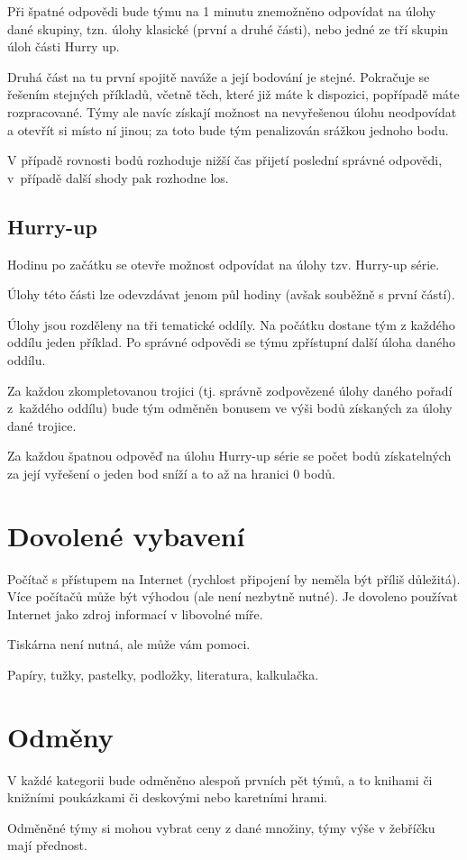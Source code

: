 \documentclass[a4paper,11pt,oneside]{article}
\begin{document}
Při špatné odpovědi bude týmu na 1 minutu znemožněno odpovídat na úlohy dané 
skupiny, tzn. úlohy klasické (první a druhé části), nebo jedné ze tří skupin úloh části Hurry up.

Druhá část na tu první spojitě naváže a její bodování je stejné. Pokračuje 
se řešením stejných příkladů, včetně těch, které již máte k dispozici, popřípadě 
máte rozpracované. Týmy ale navíc získají možnost na nevyřešenou úlohu 
neodpovídat a otevřít si místo ní jinou; za toto bude tým penalizován srážkou jednoho bodu.

V případě rovnosti bodů rozhoduje nižší čas přijetí poslední správné 
odpovědi, v~případě další shody pak rozhodne los.

\subsection*{Hurry-up}

Hodinu po začátku se otevře možnost odpovídat na úlohy tzv. Hurry-up série.

Úlohy této části lze odevzdávat jenom půl hodiny (avšak souběžně s první 
částí).

Úlohy jsou rozděleny na tři tematické oddíly. Na počátku dostane tým z 
každého oddílu jeden příklad. Po správné odpovědi se týmu zpřístupní další úloha 
daného oddílu.

Za každou zkompletovanou trojici (tj. správně zodpovězené úlohy daného 
pořadí z~každého oddílu) bude tým odměněn bonusem ve výši bodů získaných za 
úlohy dané trojice.

Za každou špatnou odpověď na úlohu Hurry-up série se počet bodů získatelných za 
její vyřešení o jeden bod sníží a to až na hranici 0 bodů.

\section{Dovolené vybavení}
Počítač s přístupem na Internet (rychlost připojení by neměla být příliš 
důležitá). Více počítačů může být výhodou (ale není nezbytně nutné). Je dovoleno 
používat Internet jako zdroj informací v libovolné míře.

Tiskárna není nutná, ale může vám pomoci.

Papíry, tužky, pastelky, podložky, literatura, kalkulačka.

\section{Odměny}

V každé kategorii bude odměněno alespoň prvních pět týmů, a to knihami či knižními poukázkami či deskovými nebo karetními hrami.

Odměněné týmy si mohou vybrat ceny z dané množiny, týmy výše v žebříčku mají přednost.
\end{document}
